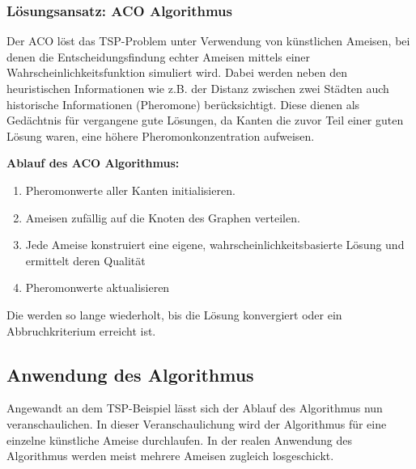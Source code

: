 \documentclass[pdftex,
               12pt,
               DIV=12,
               a4paper,
               twoside,
               parskip=half,
               abstract=true,
               dvipsnames]{scrartcl}
\begin{document}
\subsubsection{L\"osungsansatz: ACO Algorithmus}
Der ACO l\"ost das TSP-Problem unter Verwendung von k\"unstlichen Ameisen, bei denen die Entscheidungsfindung echter Ameisen mittels einer Wahrscheinlichkeitsfunktion simuliert wird. Dabei werden neben den heuristischen Informationen wie z.B. der Distanz zwischen zwei St\"adten auch historische Informationen (Pheromone) ber\"ucksichtigt. Diese dienen als Ged\"achtnis f\"ur vergangene gute L\"osungen, da Kanten die zuvor Teil einer guten L\"osung waren, eine h\"ohere Pheromonkonzentration aufweisen. \cite[vgl.][]{DorigoStuetzle04}

\textbf{Ablauf des ACO Algorithmus:}

\begin{enumerate}
	\item Pheromonwerte aller Kanten initialisieren.
	\item Ameisen zuf\"allig auf die Knoten des Graphen verteilen. \label{enum:ACO_algo_2}
	\item Jede Ameise konstruiert eine eigene, wahrscheinlichkeitsbasierte L\"osung und ermittelt deren Qualit\"at
	\item Pheromonwerte aktualisieren \label{enum:ACO_algo_4}
\end{enumerate}

Die  werden so lange wiederholt, bis die L\"osung konvergiert oder ein Abbruchkriterium erreicht ist. \cite[vgl.][]{DorigoStuetzle04}


\subsection{Anwendung des Algorithmus}
Angewandt an dem TSP-Beispiel l\"asst sich der Ablauf des Algorithmus nun veranschaulichen. In dieser Veranschaulichung wird der Algorithmus f\"ur eine einzelne k\"unstliche Ameise durchlaufen. In der realen Anwendung des Algorithmus werden meist mehrere Ameisen zugleich losgeschickt.
\end{document}
